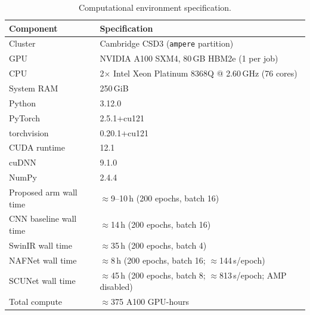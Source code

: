 \documentclass[12pt, a4paper, twoside, openright]{book}
\begin{document}
\begin{table}[H]
  \centering
  \caption{Computational environment specification.}
  \label{tab:methods:compute}
  \begin{tabular}{ll}
    \toprule
    \textbf{Component} & \textbf{Specification} \\
    \midrule
    Cluster            & Cambridge CSD3 (\texttt{ampere} partition) \\
    GPU                & NVIDIA A100 SXM4, 80\,GB HBM2e (1 per job) \\
    CPU                & 2$\times$ Intel Xeon Platinum 8368Q @ 2.60\,GHz (76 cores) \\
    System RAM         & 250\,GiB \\
    \midrule
    Python             & 3.12.0 \\
    PyTorch            & 2.5.1+cu121 \\
    torchvision        & 0.20.1+cu121 \\
    CUDA runtime       & 12.1 \\
    cuDNN              & 9.1.0 \\
    NumPy              & 2.4.4 \\
    \midrule
    Proposed arm wall time   & $\approx$9--10\,h (200 epochs, batch 16) \\
    CNN baseline wall time   & $\approx$14\,h (200 epochs, batch 16) \\
    SwinIR wall time         & $\approx$35\,h (200 epochs, batch 4) \\
    NAFNet wall time         & $\approx$8\,h (200 epochs, batch 16; $\approx$144\,s/epoch) \\
    SCUNet wall time         & $\approx$45\,h (200 epochs, batch 8; $\approx$813\,s/epoch; AMP disabled) \\
    Total compute            & $\approx$375 A100 GPU-hours \\
    \bottomrule
  \end{tabular}
\end{table}
\end{document}
